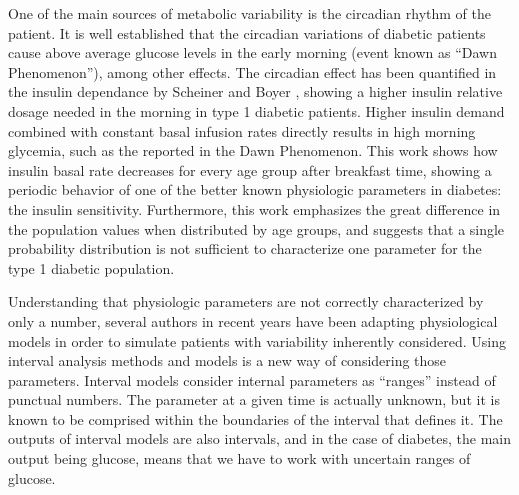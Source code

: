 One of the main sources of metabolic variability is the circadian rhythm of the patient. It is well established that the circadian variations of diabetic patients cause above average glucose levels in the early morning (event known as ``Dawn Phenomenon''), among other effects. The circadian effect has been quantified in the insulin dependance by Scheiner and Boyer \cite{scheiner2005characteristics}, showing a higher insulin relative dosage needed in the morning in type 1 diabetic patients. Higher insulin demand combined with constant basal infusion rates directly results in high morning glycemia, such as the reported in the Dawn Phenomenon. This work shows how insulin basal rate decreases for every age group after breakfast time, showing a periodic behavior of one of the better known physiologic parameters in diabetes: the insulin sensitivity. Furthermore, this work emphasizes the great difference in the population values when distributed by age groups, and suggests that a single probability distribution is not sufficient to characterize one parameter for the type 1 diabetic population.

Understanding that physiologic parameters are not correctly characterized by only a number, several authors in recent years have been adapting physiological models in order to simulate patients with variability inherently considered. Using interval analysis methods and models is a new way of considering those parameters. Interval models consider internal parameters as ``ranges'' instead of punctual numbers. The parameter at a given time is actually unknown, but it is known to be comprised within the boundaries of the interval that defines it. The outputs of interval models are also intervals, and in the case of diabetes, the main output being glucose, means that we have to work with uncertain ranges of glucose.

